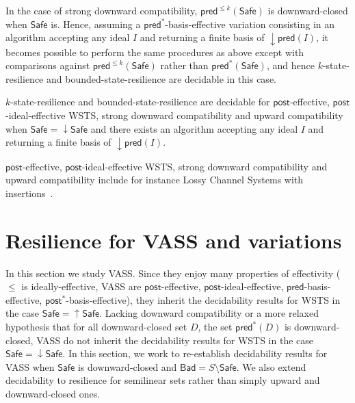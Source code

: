 \documentclass[runningheads]{llncs}
\newcommand{\alain}[1]{\todo[inline,color=red!20]{{\bf AF:} #1}}
\newcommand{\mathieu}[1]{\todo[inline,color=blue!20]{{\bf MH:} #1}}
\newcommand{\pred}{\textsf{pred}}
\newcommand{\post}{\textsf{post}}
\newcommand{\Bad}{\textsf{Bad}}
\newcommand{\Safe}{\textsf{Safe}}
\begin{document}
In the case of strong downward compatibility,
$\pred^{\leq k}(\Safe)$ is downward-closed when $\Safe$ is.
Hence, 
assuming a $\pred^*$-basis-effective variation
consisting in an algorithm
accepting any ideal $I$ and returning a finite basis of
 $\mathop{\downarrow} \pred(I)$, it becomes possible to perform the same procedures as above except with comparisons against $\pred^{\leq k}(\Safe)$ rather than $\pred^*(\Safe)$, and hence {\sc $k$-state-resilience} and {\sc bounded-state-resilience} are decidable in this case.


\begin{corollary}\label{downward brp}
{\sc $k$-state-resilience} and {\sc bounded-state-resilience} are decidable for $\post$-effective, $\post$-ideal-effective WSTS, strong downward compatibility and upward compatibility when
$\Safe = \mathop{\downarrow} \Safe$
and there exists an algorithm accepting any ideal $I$ and returning a finite basis of
 $\mathop{\downarrow} \pred(I)$.
\end{corollary}


$\post$-effective, $\post$-ideal-effective WSTS, strong downward compatibility and upward compatibility include for instance
Lossy Channel Systems with insertions~\cite{DBLP:journals/iandc/AbdullaJ96,DBLP:journals/iandc/CeceFI96}. 

\section{Resilience for VASS and variations}\label{section VASS}

In this section we study VASS. Since they enjoy many properties of effectivity ($\leq$ is ideally-effective, VASS are $\post$-effective, $\post$-ideal-effective, $\pred$-basis-effective, $\post^*$-basis-effective), they inherit the decidability results for WSTS in the case 
$\Safe = \mathop{\uparrow} \Safe$. Lacking downward compatibility or a more relaxed hypothesis that
for all downward-closed set $D$, the set $\pred^*(D)$ is downward-closed, 
VASS do not inherit the decidability results for WSTS in the case $\Safe = \mathop{\downarrow} \Safe$.
In this section, we work to re-establish decidability results for VASS when $\Safe$ is downward-closed and $\Bad = S \setminus \Safe$. We also extend decidability to resilience for semilinear sets rather than simply upward and downward-closed ones.
\end{document}
